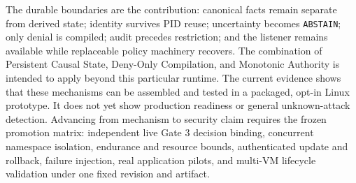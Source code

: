 \documentclass[11pt,a4paper]{article}
\begin{document}
The durable boundaries are the contribution: canonical facts remain separate
from derived state; identity survives PID reuse; uncertainty becomes
\texttt{ABSTAIN}; only denial is compiled; audit precedes restriction; and the
listener remains available while replaceable policy machinery recovers. The
combination of Persistent Causal State, Deny-Only Compilation, and Monotonic
Authority is intended to apply beyond this particular runtime. The current
evidence shows that these mechanisms can be assembled and tested in a
packaged, opt-in Linux prototype. It does not yet show production readiness or
general unknown-attack detection. Advancing from mechanism to security claim
requires the frozen promotion matrix: independent live Gate 3 decision binding,
concurrent namespace isolation, endurance and resource bounds, authenticated
update and rollback, failure injection, real application pilots, and multi-VM
lifecycle validation under one fixed revision and artifact.
\end{document}
